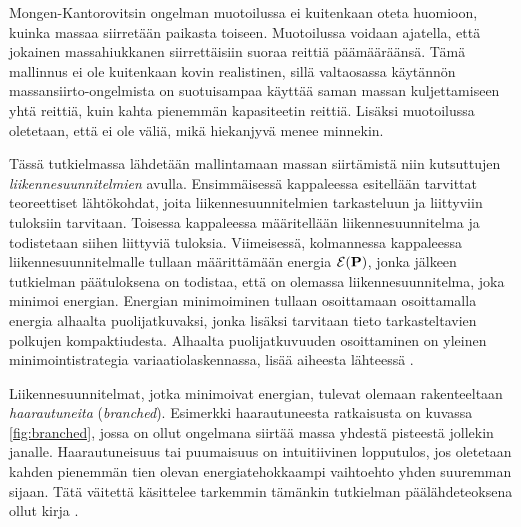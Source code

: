 \documentclass[12pt,oneside,a4paper]{amsbook} %
\begin{document}
Mongen-Kantorovitsin ongelman muotoilussa ei kuitenkaan oteta huomioon, kuinka massaa siirretään paikasta toiseen. Muotoilussa voidaan ajatella, että jokainen massahiukkanen siirrettäisiin suoraa reittiä päämääräänsä. Tämä mallinnus ei ole kuitenkaan kovin realistinen, sillä valtaosassa käytännön massansiirto-ongelmista on suotuisampaa käyttää saman massan kuljettamiseen yhtä reittiä, kuin kahta pienemmän kapasiteetin reittiä. Lisäksi muotoilussa oletetaan, että ei ole väliä, mikä hiekanjyvä menee minnekin. 

Tässä tutkielmassa lähdetään mallintamaan massan siirtämistä niin kutsuttujen \textit{liikennesuunnitelmien} avulla. Ensimmäisessä kappaleessa esitellään tarvittat teoreettiset lähtökohdat, joita liikennesuunnitelmien tarkasteluun ja liittyviin tuloksiin tarvitaan. Toisessa kappaleessa määritellään liikennesuunnitelma ja todistetaan siihen liittyviä tuloksia. Viimeisessä, kolmannessa kappaleessa liikennesuunnitelmalle tullaan määrittämään energia $\mathcal{E}(\mathbf{P})$, jonka jälkeen tutkielman päätuloksena on todistaa, että on olemassa liikennesuunnitelma, joka minimoi energian. Energian minimoiminen tullaan osoittamaan osoittamalla energia alhaalta puolijatkuvaksi, jonka lisäksi tarvitaan tieto tarkasteltavien polkujen kompaktiudesta. Alhaalta puolijatkuvuuden osoittaminen on yleinen minimointistrategia variaatiolaskennassa, lisää aiheesta lähteessä \cite{benesova}.

Liikennesuunnitelmat, jotka minimoivat energian, tulevat olemaan rakenteeltaan \textit{haarautuneita} (\textit{branched}). Esimerkki haarautuneesta ratkaisusta on kuvassa \ref{fig:branched}, jossa on ollut ongelmana siirtää massa yhdestä pisteestä jollekin janalle. Haarautuneisuus tai puumaisuus on intuitiivinen lopputulos, jos oletetaan kahden pienemmän tien olevan energiatehokkaampi vaihtoehto yhden suuremman sijaan. Tätä väitettä käsittelee tarkemmin tämänkin tutkielman päälähdeteoksena ollut kirja \cite{optimal}.
\end{document}

